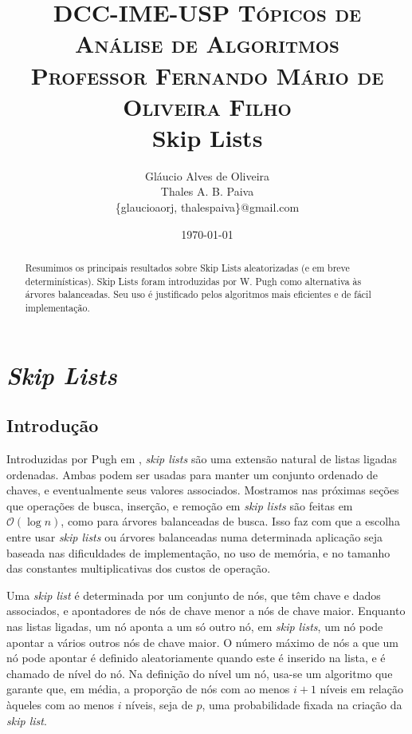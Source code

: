 \documentclass[paper=a4, fontsize=11pt]{scrartcl} %
\title{ 
\normalfont \small 
\textsc{DCC-IME-USP Tópicos de Análise de Algoritmos \\ Professor Fernando Mário de Oliveira Filho} \\ [25pt]
\huge Skip Lists%
}
\author{Gláucio Alves de Oliveira \\ Thales A. B. Paiva 
        \\ \scriptsize \{glaucioaorj, thalespaiva\}@gmail.com}
\date{\normalsize\today}
\numberwithin{equation}{section}
\numberwithin{figure}{section}
\numberwithin{table}{section}
\numberwithin{definition}{section}
\numberwithin{theorem}{section}
\numberwithin{property}{section}
\numberwithin{proposition}{section}
\newcommand{\horrule}[1]{\rule{\linewidth}{#1}} %
\newcommand{\cO}{\ensuremath{\mathcal{O}}}
\newcommand{\SLs}{\textit{Skip Lists}\xspace}
\newcommand{\sls}{\textit{skip lists}\xspace}
\renewcommand{\sl}{\textit{skip list}\xspace}
\begin{document}
\maketitle %

\begin{abstract} \noindent

Resumimos os principais resultados sobre Skip Lists aleatorizadas (e em breve determinísticas). 
Skip Lists foram introduzidas por W. Pugh como alternativa às árvores balanceadas. 
Seu uso é justificado pelos algoritmos mais eficientes e de fácil implementação.

\end{abstract}

\tableofcontents

\pagebreak
\section{\SLs}
\FloatBarrier

\subsection{Introdução}

Introduzidas por Pugh em \cite{pugh1990skip}, \sls são uma extensão natural de listas ligadas ordenadas. 
Ambas podem ser usadas para manter um conjunto ordenado de chaves, e eventualmente seus valores associados.
Mostramos nas próximas seções que operações de busca, inserção, e remoção em \sls são feitas em $\cO(\log n)$, 
como para árvores balanceadas de busca. Isso faz com que a escolha entre usar \sls ou árvores balanceadas numa
determinada aplicação seja baseada nas dificuldades de implementação, no uso de memória, e no tamanho das 
constantes multiplicativas dos custos de operação. 

Uma \sl é determinada por um conjunto de nós, que têm chave e dados associados, e apontadores de nós de chave 
menor a nós de chave maior.
Enquanto nas listas ligadas, um nó aponta a um só outro nó, em \sls, um nó pode apontar a vários 
outros nós de chave maior. 
O número máximo de nós a que um nó pode apontar é definido aleatoriamente quando este é inserido na lista, e 
é chamado de nível do nó. Na definição do nível um nó, usa-se um algoritmo que garante que, em média, a proporção 
de nós com ao menos $i + 1$ níveis em relação àqueles com ao menos $i$ níveis, seja de $p$, uma probabilidade
fixada na criação da \sl.
\end{document}
